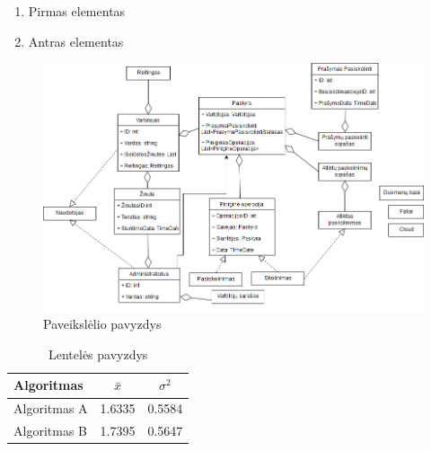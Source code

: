 \documentclass{VUMIFPSkursinis}
\begin{document}
\begin{enumerate}
	\item Pirmas elementas
	\item Antras elementas
\end{enumerate}

\begin{figure}[H]
    \centering
    \includegraphics[scale=0.5]{img/DomainModel}
    \caption{Paveikslėlio pavyzdys}
    \label{img:mlp}
\end{figure}

\begin{table}[H]\footnotesize
  \centering
  \caption{Lentelės pavyzdys}
  {\begin{tabular}{|l|c|c|} \hline
    Algoritmas & $\bar{x}$ & $\sigma^{2}$ \\
    \hline
    Algoritmas A  & 1.6335    & 0.5584       \\
    Algoritmas B  & 1.7395    & 0.5647       \\
    \hline
  \end{tabular}}
  \label{tab:table example}
\end{table}
\end{document}
